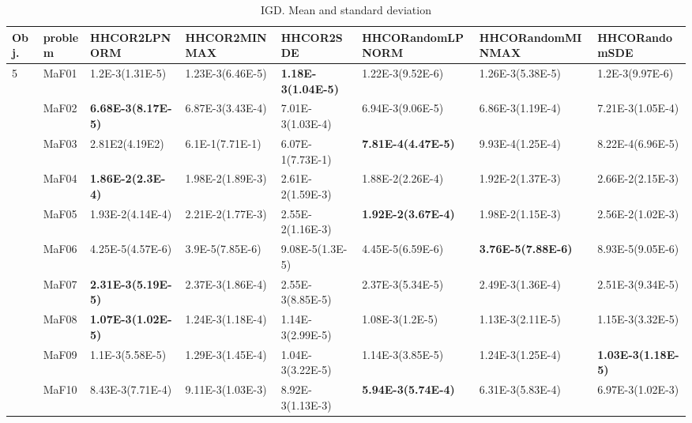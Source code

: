 \documentclass[]{article}
\begin{document}
\begin{landscape}
\begin{table}
\caption{IGD. Mean and standard deviation}
\label{table:mean.IGD}
\centering
\begin{footnotesize}
\begin{tabular}{|l|l|l|l|l|l|l|l|}
\hline
Obj. & problem  & HHCOR2LPNORM & HHCOR2MINMAX & HHCOR2SDE & HHCORandomLPNORM & HHCORandomMINMAX & HHCORandomSDE \\ \hline

\multirow{15}{*}{5} & MaF01 & \cellcolor{gray95} 1.2E-3(1.31E-5) & 1.23E-3(6.46E-5) & \cellcolor{gray95} {\bf 1.18E-3(1.04E-5)} & 1.22E-3(9.52E-6) & 1.26E-3(5.38E-5) & \cellcolor{gray95} 1.2E-3(9.97E-6)\\
 & MaF02 & \cellcolor{gray95} {\bf 6.68E-3(8.17E-5)} & 6.87E-3(3.43E-4) & 7.01E-3(1.03E-4) & 6.94E-3(9.06E-5) & \cellcolor{gray95} 6.86E-3(1.19E-4) & 7.21E-3(1.05E-4)\\
 & MaF03 & 2.81E2(4.19E2) & 6.1E-1(7.71E-1) & 6.07E-1(7.73E-1) & \cellcolor{gray95} {\bf 7.81E-4(4.47E-5)} & 9.93E-4(1.25E-4) & \cellcolor{gray95} 8.22E-4(6.96E-5)\\
 & MaF04 & \cellcolor{gray95} {\bf 1.86E-2(2.3E-4)} & \cellcolor{gray95} 1.98E-2(1.89E-3) & 2.61E-2(1.59E-3) & \cellcolor{gray95} 1.88E-2(2.26E-4) & \cellcolor{gray95} 1.92E-2(1.37E-3) & 2.66E-2(2.15E-3)\\
 & MaF05 & \cellcolor{gray95} 1.93E-2(4.14E-4) & 2.21E-2(1.77E-3) & 2.55E-2(1.16E-3) & \cellcolor{gray95} {\bf 1.92E-2(3.67E-4)} & \cellcolor{gray95} 1.98E-2(1.15E-3) & 2.56E-2(1.02E-3)\\
 & MaF06 & \cellcolor{gray95} 4.25E-5(4.57E-6) & \cellcolor{gray95} 3.9E-5(7.85E-6) & 9.08E-5(1.3E-5) & \cellcolor{gray95} 4.45E-5(6.59E-6) & \cellcolor{gray95} {\bf 3.76E-5(7.88E-6)} & 8.93E-5(9.05E-6)\\
 & MaF07 & \cellcolor{gray95} {\bf 2.31E-3(5.19E-5)} & \cellcolor{gray95} 2.37E-3(1.86E-4) & 2.55E-3(8.85E-5) & \cellcolor{gray95} 2.37E-3(5.34E-5) & 2.49E-3(1.36E-4) & 2.51E-3(9.34E-5)\\
 & MaF08 & \cellcolor{gray95} {\bf 1.07E-3(1.02E-5)} & 1.24E-3(1.18E-4) & 1.14E-3(2.99E-5) & \cellcolor{gray95} 1.08E-3(1.2E-5) & 1.13E-3(2.11E-5) & 1.15E-3(3.32E-5)\\
 & MaF09 & 1.1E-3(5.58E-5) & 1.29E-3(1.45E-4) & \cellcolor{gray95} 1.04E-3(3.22E-5) & 1.14E-3(3.85E-5) & 1.24E-3(1.25E-4) & \cellcolor{gray95} {\bf 1.03E-3(1.18E-5)}\\
 & MaF10 & 8.43E-3(7.71E-4) & 9.11E-3(1.03E-3) & 8.92E-3(1.13E-3) & \cellcolor{gray95} {\bf 5.94E-3(5.74E-4)} & \cellcolor{gray95} 6.31E-3(5.83E-4) & \cellcolor{gray95} 6.97E-3(1.02E-3)\\

\end{tabular}
\end{footnotesize}
\end{table}
\end{landscape}
\end{document}

